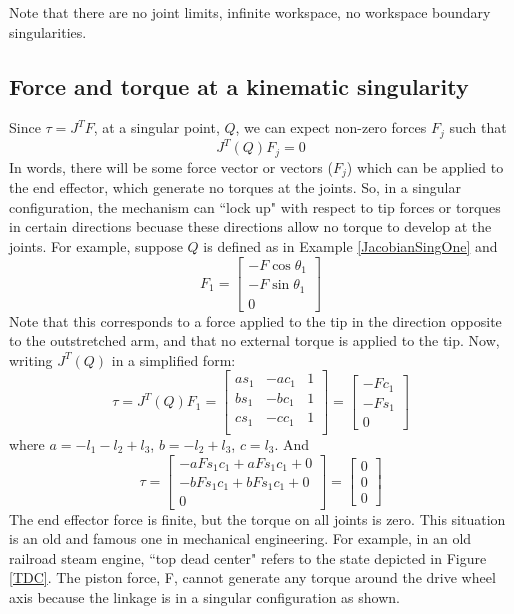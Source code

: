 \begin{ExampleSmall}
Note that there are no joint limits, infinite workspace, no
workspace boundary singularities.

\end{ExampleSmall}


\subsection{Force and torque at a kinematic singularity}
Since $\tau=J^T F$, at a singular point, $Q$, we can expect non-zero forces $F_j$ such that \[
J^T(Q)F_j = 0
\]
In words, there will be some force vector or vectors ($F_j$) which can be applied to the end effector, which generate no torques at the joints.  So, in a singular configuration, the mechanism can ``lock up" with respect to tip forces or torques in certain directions becuase these directions allow no torque to develop at the joints. For example, suppose $Q$ is defined as in Example \ref{JacobianSingOne} and
\[
F_1 = \begin{bmatrix} -F\cos\theta_1 \\ -F\sin\theta_1 \\ 0 \end{bmatrix}
\]
Note that this corresponds to a force applied to the tip in the direction opposite to the outstretched arm, and that no external torque is applied to the tip.  Now, writing $J^T(Q)$ in a simplified form:
\[
\tau = J^T(Q)F_1 =
\begin{bmatrix}
   as_1 & -ac_1 & 1  \\
   bs_1 & -bc_1 & 1  \\
   cs_1 & -cc_1 & 1  \\
\end{bmatrix}              =
\begin{bmatrix}
-Fc_1  \\ -Fs_1  \\ 0
\end{bmatrix}
\]
where $a = -l_1 -l_2 +l_3$, $b = -l_2 +l_3$, $c = l_3$.  And
\[
\tau = \begin{bmatrix}
-aFs_1c_1+aFs_1c_1 + 0 \\
-bFs_1c_1+bFs_1c_1 + 0   \\
0
\end{bmatrix}                 =
\begin{bmatrix}  0 \\ 0 \\ 0 \end{bmatrix}
\]
The end effector force is finite, but the torque on all joints is zero.
This situation is an old and famous one in mechanical engineering. For example, in an old railroad steam engine, ``top dead center" refers to the
state depicted in Figure \ref{TDC}.
The piston force, F, cannot generate any torque around the drive wheel axis because the linkage is in a singular configuration as shown.


